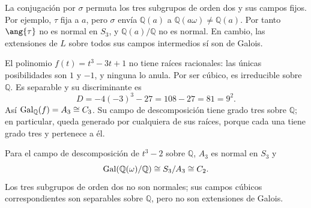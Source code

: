 \begin{ejem}
La conjugación por $\sigma$ permuta los tres subgrupos de orden dos y sus campos fijos. Por ejemplo, $\tau$ fija a $a$, pero $\sigma$ envía $\mathbb Q(a)$ a $\mathbb Q(a\omega)\ne\mathbb Q(a)$. Por tanto $\ang{\tau}$ no es normal en $S_3$, y $\mathbb Q(a)/\mathbb Q$ no es normal. En cambio, las extensiones de $L$ sobre todos sus campos intermedios sí son de Galois.
\end{ejem}

\begin{ejem}
El polinomio $f(t)=t^3-3t+1$ no tiene raíces racionales: las únicas posibilidades son $1$ y $-1$, y ninguna lo anula. Por ser cúbico, es irreducible sobre $\mathbb Q$. Es separable y su discriminante es
\[
D=-4(-3)^3-27=108-27=81=9^2.
\]
Así $\operatorname{Gal}_{\mathbb Q}(f)=A_3\cong C_3$. Su campo de descomposición tiene grado tres sobre $\mathbb Q$; en particular, queda generado por cualquiera de sus raíces, porque cada una tiene grado tres y pertenece a él.
\end{ejem}

Para el campo de descomposición de $t^3-2$ sobre $\mathbb Q$, $A_3$ es normal en $S_3$ y
\[
\operatorname{Gal}(\mathbb Q(\omega)/\mathbb Q)\cong S_3/A_3\cong C_2.
\]
Los tres subgrupos de orden dos no son normales; sus campos cúbicos correspondientes son separables sobre $\mathbb Q$, pero no son extensiones de Galois.
